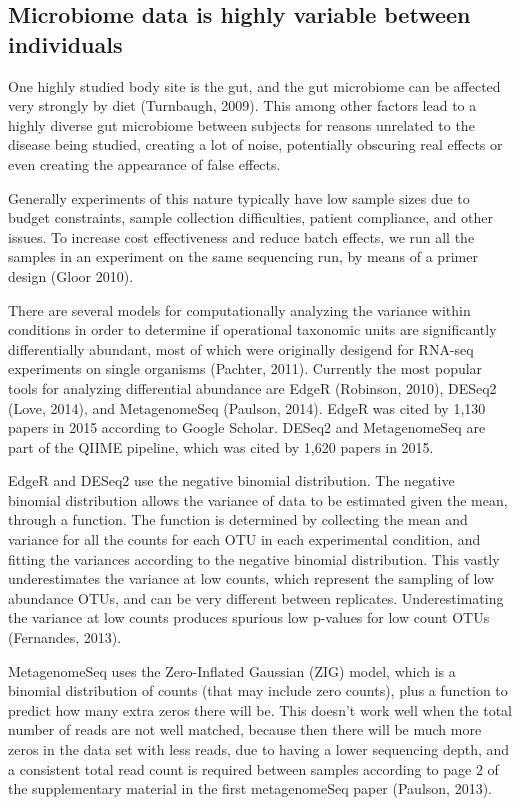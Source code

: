 \subsection{Microbiome data is highly variable between individuals}
One highly studied body site is the gut, and the gut microbiome can be affected very strongly by diet (Turnbaugh, 2009). This among other factors lead to a highly diverse gut microbiome between subjects for reasons unrelated to the disease being studied, creating a lot of noise, potentially obscuring real effects or even creating the appearance of false effects.

Generally experiments of this nature typically have low sample sizes due to budget constraints, sample collection difficulties, patient compliance, and other issues. To increase cost effectiveness and reduce batch effects, we run all the samples in an experiment on the same sequencing run, by means of a primer design (Gloor 2010).

There are several models for computationally analyzing the variance within conditions in order to determine if operational taxonomic units are significantly differentially abundant, most of which were originally desigend for RNA-seq experiments on single organisms (Pachter, 2011). Currently the most popular tools for analyzing differential abundance are EdgeR (Robinson, 2010), DESeq2 (Love, 2014), and MetagenomeSeq (Paulson, 2014). EdgeR was cited by 1,130 papers in 2015 according to Google Scholar. DESeq2 and MetagenomeSeq are part of the QIIME pipeline, which was cited by 1,620 papers in 2015.

EdgeR and DESeq2 use the negative binomial distribution. The negative binomial distribution allows the variance of data to be estimated given the mean, through a function. The function is determined by collecting the mean and variance for all the counts for each OTU in each experimental condition, and fitting the variances according to the negative binomial distribution. This vastly underestimates the variance at low counts, which represent the sampling of low abundance OTUs, and can be very different between replicates. Underestimating the variance at low counts produces spurious low p-values for low count OTUs (Fernandes, 2013).

MetagenomeSeq uses the Zero-Inflated Gaussian (ZIG) model, which is a binomial distribution of counts (that may include zero counts), plus a function to predict how many extra zeros there will be. This doesn’t work well when the total number of reads are not well matched, because then there will be much more zeros in the data set with less reads, due to having a lower sequencing depth, and a consistent total read count is required between samples according to page 2 of the supplementary material in the first metagenomeSeq paper (Paulson, 2013).

